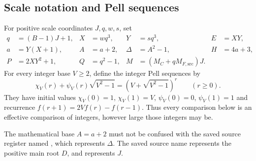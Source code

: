 \documentclass[11pt,letterpaper]{article}
\theoremstyle{definition}\newtheorem{definition}[theorem]{Definition}
\theoremstyle{remark}\newtheorem{remark}[theorem]{Remark}
\newcommand{\code}[1]{\texttt{\detokenize{#1}}}
\newcommand{\MC}{M_C}
\newcommand{\MFsrcV}{M_{F,\mathrm{src}}}
\begin{document}
\subsection{Scale notation and Pell sequences}
For positive scale coordinates $J,q,w,s$, set
\begin{align}\label{fup:nz:eq:scales}
 q&=(B-1)J+1,& X&=wq^3,&Y&=sq^3,&E&=XY,\\
 a&=Y(X+1),& A&=a+2,&\Delta&=A^2-1,&H&=4a+3,\\
 P&=2XY^2+1,&Q&=q^2-1,&M&=(\MC+q\MFsrcV)J.&&\nonumber
\end{align}
For every integer base $V\ge2$, define the integer Pell sequences by
\begin{equation}\label{fup:nz:eq:pell}
 \chi_V(r)+\psi_V(r)\sqrt{V^2-1}
       =\left(V+\sqrt{V^2-1}\right)^r\qquad(r\ge0).
\end{equation}
They have initial values $\chi_V(0)=1$, $\chi_V(1)=V$, $\psi_V(0)=0$, $\psi_V(1)=1$ and recurrence $f(r+1)=2Vf(r)-f(r-1)$. Thus every comparison below is an effective comparison of integers, however large those integers may be.

The mathematical base $A=a+2$ must not be confused with the saved source register named \code{A}, which represents $\Delta$. The saved source name \code{d} represents the positive main root $D$, and \code{Jrep} represents $J$.
\end{document}
